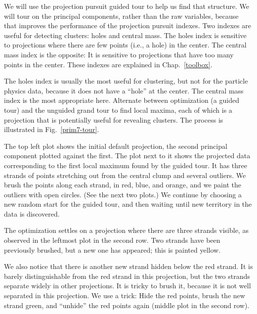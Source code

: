 
We will use the projection pursuit guided tour to help us find that
structure.  We will tour on the principal components, rather than the
raw variables, because that improves the performance of the projection
pursuit indexes.  Two indexes are useful for detecting
clusters: holes and central mass. The holes index is sensitive to
projections where there are few points (i.e., a hole) in the center.
The central mass index is the opposite: It is sensitive to projections
that have too many points in the center. These indexes are explained
in Chap.~\ref{toolbox}.

The holes index is usually the most useful for clustering, but not for
the particle physics data, because it does not have a ``hole'' at the
center.  The central mass index is the most appropriate
here. Alternate between optimization (a guided tour) and the unguided
grand tour to find local maxima, each of which is a projection that
is potentially useful for revealing clusters.  The process is
illustrated in Fig.~\ref{prim7-tour}.

The top left plot shows the initial default projection, the second
principal component plotted against the first. The plot next to it
shows the projected data corresponding to the first local maximum
found by the guided tour. It has three strands of points stretching
out from the central clump and several outliers. We brush the points
along each strand, in red, blue, and orange, and we paint the outliers 
with open circles.  (See the next two plots.)  We continue by choosing a
new random start for the guided tour, and then waiting until new territory
in the data is discovered. 

The optimization settles on a projection where there are three strands
visible, as observed in the leftmost plot in the second row. Two 
strands have been previously brushed, but a new one has appeared; this
is painted yellow. 

We also notice that there is another new strand hidden below the red
strand. It is barely distinguishable from the red strand in this
projection, but the two strands separate widely in other projections.
It is tricky to brush it, because it is not well separated in this
projection.  We use a trick: Hide the red points, brush the new strand
green, and ``unhide'' the red points again (middle plot in the second
row).

